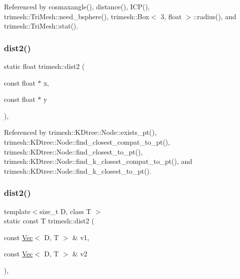 Referenced by cosmaxangle(), distance(), I\+C\+P(), trimesh\+::\+Tri\+Mesh\+::need\+\_\+bsphere(), trimesh\+::\+Box$<$ 3, float $>$\+::radius(), and trimesh\+::\+Tri\+Mesh\+::stat().

\mbox{\label{namespacetrimesh_af6f9302ecaa83001e0da7b8aa102233a}} 
\subsubsection{\texorpdfstring{dist2()}{dist2()}\hspace{0.1cm}{\footnotesize\ttfamily [1/2]}}
{\footnotesize\ttfamily static float trimesh\+::dist2 (\begin{DoxyParamCaption}\item[{const float $\ast$}]{x,  }\item[{const float $\ast$}]{y }\end{DoxyParamCaption})\hspace{0.3cm}{\ttfamily [inline]}, {\ttfamily [static]}}



Referenced by trimesh\+::\+K\+Dtree\+::\+Node\+::exists\+\_\+pt(), trimesh\+::\+K\+Dtree\+::\+Node\+::find\+\_\+closest\+\_\+compat\+\_\+to\+\_\+pt(), trimesh\+::\+K\+Dtree\+::\+Node\+::find\+\_\+closest\+\_\+to\+\_\+pt(), trimesh\+::\+K\+Dtree\+::\+Node\+::find\+\_\+k\+\_\+closest\+\_\+compat\+\_\+to\+\_\+pt(), and trimesh\+::\+K\+Dtree\+::\+Node\+::find\+\_\+k\+\_\+closest\+\_\+to\+\_\+pt().

\mbox{\label{namespacetrimesh_a6bae650c3099c0e601cf4257ffba2f99}} 
\subsubsection{\texorpdfstring{dist2()}{dist2()}\hspace{0.1cm}{\footnotesize\ttfamily [2/2]}}
{\footnotesize\ttfamily template$<$size\+\_\+t D, class T $>$ \\
static const T trimesh\+::dist2 (\begin{DoxyParamCaption}\item[{const \hyperlink{classtrimesh_1_1Vec}{Vec}$<$ D, T $>$ \&}]{v1,  }\item[{const \hyperlink{classtrimesh_1_1Vec}{Vec}$<$ D, T $>$ \&}]{v2 }\end{DoxyParamCaption})\hspace{0.3cm}{\ttfamily [inline]}, {\ttfamily [static]}}



